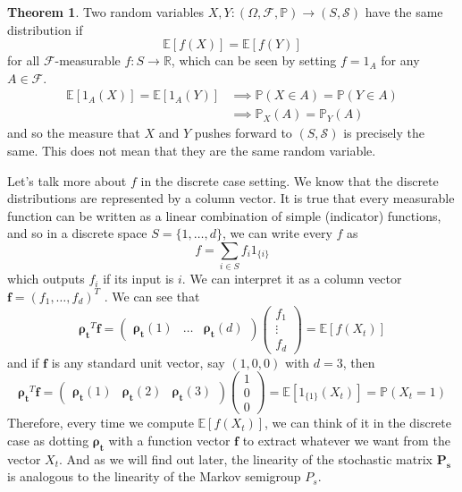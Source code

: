 \documentclass{article}
\theoremstyle{definition}
\newtheorem{theorem}{Theorem}[section]
\theoremstyle{remark}
\theoremstyle{definition}
\begin{document}
\begin{theorem}
Two random variables $X, Y : (\Omega, \mathcal{F}, \mathbb{P}) \rightarrow (S, \mathcal{S})$ have the same distribution if 
\[\mathbb{E}[f(X)] = \mathbb{E}[f(Y)]\]
for all $\mathcal{F}$-measurable $f: S \rightarrow \mathbb{R}$, which can be seen by setting $f = 1_A$ for any $A \in \mathcal{F}$. 
\begin{align*}
    \mathbb{E}[1_A (X)] = \mathbb{E}[1_A (Y)] & \implies \mathbb{P}(X \in A) = \mathbb{P}(Y \in A) \\
    & \implies \mathbb{P}_X (A) = \mathbb{P}_Y (A)
\end{align*}
and so the measure that $X$ and $Y$ pushes forward to $(S, \mathcal{S})$ is precisely the same. This does not mean that they are the same random variable. 
\end{theorem}

Let's talk more about $f$ in the discrete case setting. We know that the discrete distributions are represented by a column vector. It is true that every measurable function can be written as a linear combination of simple (indicator) functions, and so in a discrete space $S = \{1, \ldots, d\}$, we can write every $f$ as 
\[f = \sum_{i \in S} f_i 1_{\{i\}} \]
which outputs $f_i$ if its input is $i$. We can interpret it as a column vector $\mathbf{f} = (f_1, \ldots, f_d)^T$ . We can see that 
\[\boldsymbol{\rho_t}^T \mathbf{f} = \begin{pmatrix} \boldsymbol{\rho_t} (1) & \ldots & \boldsymbol{\rho_t} (d) \end{pmatrix} \begin{pmatrix} f_1 \\ \vdots \\ f_d \end{pmatrix} = \mathbb{E}[f(X_t)]\]
and if $\mathbf{f}$ is any standard unit vector, say $(1, 0, 0)$ with $d = 3$, then
\[\boldsymbol{\rho_t}^T \mathbf{f}  = \begin{pmatrix} \boldsymbol{\rho_t} (1) & \boldsymbol{\rho_t} (2) & \boldsymbol{\rho_t} (3) \end{pmatrix} \begin{pmatrix} 1 \\ 0 \\ 0 \end{pmatrix}= \mathbb{E}[1_{\{1\}} (X_t)] = \mathbb{P}(X_t = 1)\]
Therefore, every time we compute $\mathbb{E}[f(X_t)]$, we can think of it in the discrete case as dotting $\boldsymbol{\rho_t}$ with a function vector $\mathbf{f}$ to extract whatever we want from the vector $X_t$. And as we will find out later, the linearity of the stochastic matrix $\mathbf{P_s}$ is analogous to the linearity of the Markov semigroup $P_s$.  
\end{document}
